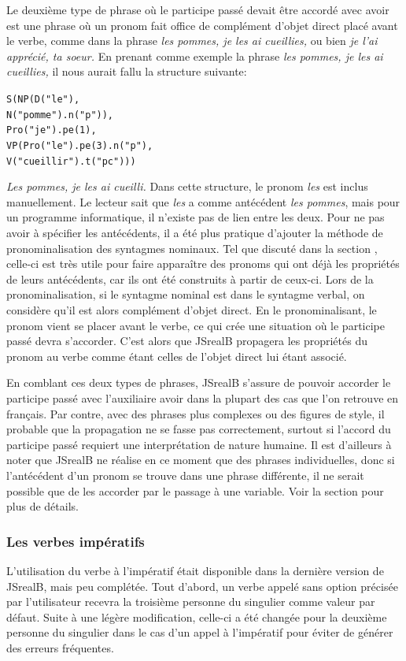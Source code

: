 \documentclass[11pt]{article} %
\newcommand{\system}[1]{\textsf{#1}}
\newcommand{\JSB}{\system{JSrealB}}
\newcommand{\real}[1]{\emph{#1}}
\begin{document}
Le deuxième type de phrase où le participe passé devait être accordé
avec avoir est une phrase où un pronom fait office de complément d'objet
direct placé avant le verbe, comme dans la phrase \emph{les pommes,
je les ai cueillies, }ou bien \emph{je l'ai apprécié, ta soeur. }En
prenant comme exemple la phrase \emph{les pommes, je les ai cueillies,
}il nous aurait fallu la structure suivante: 
\begin{alltt}
S(NP(D("le"),
     N("pomme").n("p")),
  Pro("je").pe(1),
  VP(Pro("le").pe(3).n("p"),
     V("cueillir").t("pc")))
\end{alltt}
\real{Les pommes, je les ai cueilli.}
Dans cette structure, le pronom \emph{les} est inclus manuellement.
Le lecteur sait que \emph{les} a comme antécédent \emph{les pommes},
mais pour un programme informatique, il n'existe pas de lien entre
les deux. Pour ne pas avoir à spécifier les antécédents, il a été
plus pratique d'ajouter la méthode de pronominalisation des syntagmes
nominaux. Tel que discuté dans la section \hyperref[pronomi]{}, celle-ci est très utile pour
faire apparaître des pronoms qui ont déjà les propriétés de leurs
antécédents, car ils ont été construits à partir de ceux-ci. Lors
de la pronominalisation, si le syntagme nominal est dans le syntagme
verbal, on considère qu'il est alors complément d'objet direct. En
le pronominalisant, le pronom vient se placer avant le verbe, ce qui
crée une situation où le participe passé devra s'accorder. C'est alors
que \JSB{} propagera les propriétés du pronom au verbe comme étant
celles de l'objet direct lui étant associé.

En comblant ces deux types de phrases, \JSB{} s'assure
de pouvoir accorder le participe passé avec l'auxiliaire avoir dans
la plupart des cas que l'on retrouve en français. Par contre, avec
des phrases plus complexes ou des figures de style, il probable que
la propagation ne se fasse pas correctement, surtout si l'accord du
participe passé requiert une interprétation de nature humaine. Il
est d'ailleurs à noter que \JSB{} ne réalise en ce moment que des
phrases individuelles, donc si l'antécédent d'un pronom se trouve
dans une phrase différente, il ne serait possible que de les accorder
par le passage à une variable. Voir la section \hyperref[clone]{}pour plus de détails.


\subsubsection{Les verbes impératifs}
\label{imperatif}
L'utilisation du verbe à l'impératif était disponible dans la dernière
version de \JSB{}, mais peu complétée. Tout d'abord, un verbe appelé
sans option précisée par l'utilisateur recevra la troisième personne
du singulier comme valeur par défaut. Suite à une légère modification,
celle-ci a été changée pour la deuxième personne du singulier dans
le cas d'un appel à l'impératif pour éviter de générer des erreurs
fréquentes.
\end{document}
